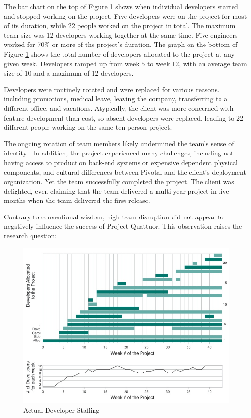 The bar chart on the top of Figure \ref{DeveloperStaffing} shows when individual developers started and stopped working on the project. Five developers were on the project for most of its duration, while 22 people worked on the project in total. The maximum team size was 12 developers working together at the same time. Five engineers worked for 70\% or more of the project's duration. The graph on the bottom of Figure \ref{DeveloperStaffing} shows the total number of developers allocated to the project at any given week. Developers ramped up from week 5 to week 12, with an average team size of 10 and a maximum of 12 developers.

Developers were routinely rotated and were replaced for various reasons, including promotions, medical leave, leaving the company, transferring to a different office, and vacations. Atypically, the client was more concerned with feature development than cost, so absent developers were replaced, leading to 22 different people working on the same ten-person project. 

The ongoing rotation of team members likely undermined the team's sense of identity \cite{TuckmanModel}. In addition, the project experienced many challenges, including not having access to production back-end systems or expensive dependent physical components, and cultural differences between Pivotal and the client's deployment organization. Yet the team successfully completed the project. The client was delighted, even claiming that the team delivered a multi-year project in five months when the team delivered the first release. 

Contrary to conventional wisdom, high team disruption did not appear to negatively influence the success of Project Quattuor. This observation raises the research question: 

\begin{figure}[t]
\centering
\includegraphics[width=\twoColumnWidth{}]{sustainable_software_development_images/DeveloperStaffingV4.jpg}
\caption{Actual Developer Staffing}
\label{DeveloperStaffing}
\end{figure}

